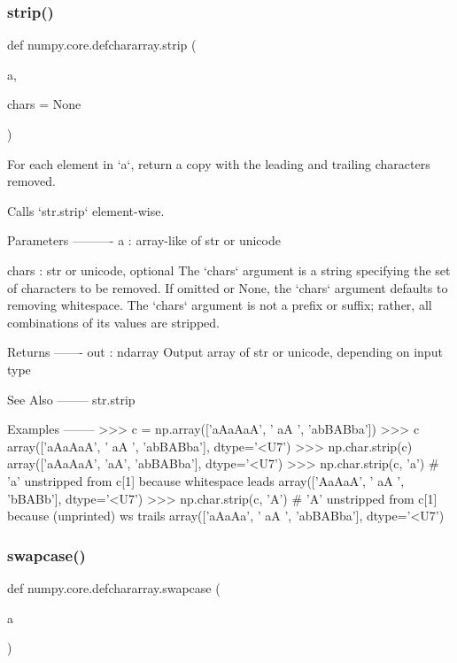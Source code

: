 \subsubsection{\texorpdfstring{strip()}{strip()}}
{\footnotesize\ttfamily def numpy.\+core.\+defchararray.\+strip (\begin{DoxyParamCaption}\item[{}]{a,  }\item[{}]{chars = {\ttfamily None} }\end{DoxyParamCaption})}

\begin{DoxyVerb}For each element in `a`, return a copy with the leading and
trailing characters removed.

Calls `str.strip` element-wise.

Parameters
----------
a : array-like of str or unicode

chars : str or unicode, optional
   The `chars` argument is a string specifying the set of
   characters to be removed. If omitted or None, the `chars`
   argument defaults to removing whitespace. The `chars` argument
   is not a prefix or suffix; rather, all combinations of its
   values are stripped.

Returns
-------
out : ndarray
    Output array of str or unicode, depending on input type

See Also
--------
str.strip

Examples
--------
>>> c = np.array(['aAaAaA', '  aA  ', 'abBABba'])
>>> c
array(['aAaAaA', '  aA  ', 'abBABba'], dtype='<U7')
>>> np.char.strip(c)
array(['aAaAaA', 'aA', 'abBABba'], dtype='<U7')
>>> np.char.strip(c, 'a') # 'a' unstripped from c[1] because whitespace leads
array(['AaAaA', '  aA  ', 'bBABb'], dtype='<U7')
>>> np.char.strip(c, 'A') # 'A' unstripped from c[1] because (unprinted) ws trails
array(['aAaAa', '  aA  ', 'abBABba'], dtype='<U7')\end{DoxyVerb}
 \mbox{\label{namespacenumpy_1_1core_1_1defchararray_af9c376c776da12e27a440f6a927adea9}} 
\subsubsection{\texorpdfstring{swapcase()}{swapcase()}}
{\footnotesize\ttfamily def numpy.\+core.\+defchararray.\+swapcase (\begin{DoxyParamCaption}\item[{}]{a }\end{DoxyParamCaption})}

